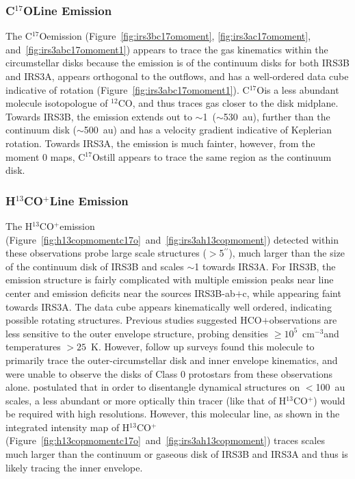 \documentclass[twocolumn, 12pt,trackchanges]{aastex63}
\newcommand{\cso}{C$^{17}$O}
\newcommand{\htcop}{H$^{13}$CO$^+$}
\newcommand{\co}{$^{12}$CO}
\renewcommand{\arcsec}{$^{\prime\prime}$}
\newcommand{\ab}{$\sim$}
\begin{document}
\subsubsection{\cso\space Line Emission}\label{sec:csoemission}
The \cso\space emission (Figure~\ref{fig:irs3bc17omoment}, \ref{fig:irs3ac17omoment}, and~\ref{fig:irs3abc17omoment1}) appears to trace the gas kinematics within the circumstellar disks because the emission is  of the continuum disks for both IRS3B and IRS3A, appears orthogonal to the outflows, and has a well-ordered data cube indicative of rotation (Figure~\ref{fig:irs3abc17omoment1}). \cso\space is a less abundant molecule \citep[ISM $\lbrack$\co$\rbrack/\lbrack$\cso$\rbrack\approx$1700:1; e.g.][]{1994ARAA..32..191W} isotopologue of \co\space\citep[ISM $\lbrack H_{2}\rbrack/\lbrack$\co$\rbrack\approx$10$^{4}$:1; e.g.][]{2009AA...503..323V}, and thus traces gas closer to the disk midplane. Towards IRS3B, the emission extends out to \ab1~(\ab530~au), further than the continuum disk (\ab500~au) and has a velocity gradient indicative of Keplerian rotation. Towards IRS3A, the emission is much fainter, however, from the moment 0 maps, \cso\space still appears to trace the same region as the continuum disk.

\subsubsection{\htcop\space Line Emission}\label{sec:htcopemission}
The \htcop\space emission (Figure~\ref{fig:h13copmomentc17o}~and~\ref{fig:irs3ah13copmoment}) detected within these observations probe large scale structures ($>$5\arcsec), much larger than the size of the continuum disk of IRS3B and scales \ab1 towards IRS3A. For IRS3B, the emission structure is fairly complicated with multiple emission peaks near line center and emission deficits near the sources IRS3B-ab$+$c, while appearing faint towards IRS3A. The data cube appears kinematically well ordered, indicating possible rotating structures. Previous studies suggested HCO$+$\space observations are less sensitive to the outer envelope structure, probing densities $\ge10^{5}$~cm$^{-3}$\space and temperatures $>25$~K\space \citep{1999ARAA..37..311E}. However, follow up surveys \citep{2009AA...507..861J} found this molecule to primarily trace the outer-circumstellar disk and inner envelope kinematics, and were unable to observe the disks of Class 0 protostars from these observations alone. \citet{2009AA...507..861J}\space postulated that in order to disentangle dynamical structures on $<$100~au scales, a less abundant or more optically thin tracer (like that of \htcop) would be required with high resolutions. However, this molecular line, as shown in the integrated intensity map of \htcop\space (Figure~\ref{fig:h13copmomentc17o}~and~\ref{fig:irs3ah13copmoment}) traces scales much larger than the continuum or gaseous disk of IRS3B and IRS3A and thus is likely tracing the inner envelope.
\end{document}
